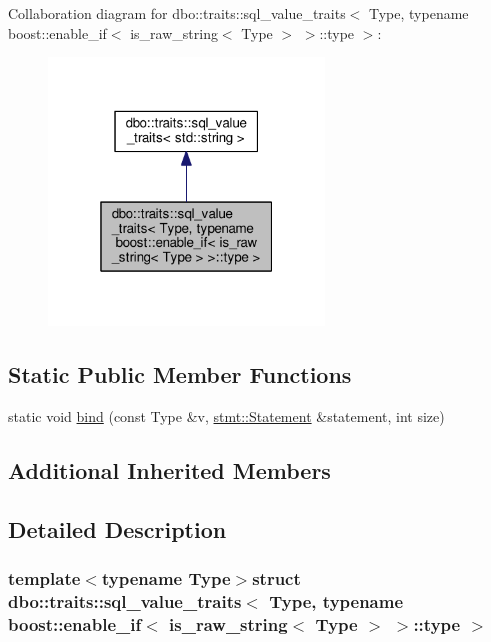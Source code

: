 Collaboration diagram for dbo\+:\+:traits\+:\+:sql\+\_\+value\+\_\+traits$<$ Type, typename boost\+:\+:enable\+\_\+if$<$ is\+\_\+raw\+\_\+string$<$ Type $>$ $>$\+:\+:type $>$\+:\nopagebreak
\begin{figure}[H]
\begin{center}
\leavevmode
\includegraphics[width=208pt]{structdbo_1_1traits_1_1sql__value__traits_3_01_type_00_01typename_01boost_1_1enable__if_3_01is__09f9c416e24b79e8600cb3841ebf4f44}
\end{center}
\end{figure}
\subsection*{Static Public Member Functions}
\begin{DoxyCompactItemize}
\item 
static void \hyperlink{structdbo_1_1traits_1_1sql__value__traits_3_01_type_00_01typename_01boost_1_1enable__if_3_01is__aa5117fa5e949e5d70ea0660f0e85288_acc179a3184edb8ce906de3d47d7bc017}{bind} (const Type \&v, \hyperlink{classdbo_1_1stmt_1_1_statement}{stmt\+::\+Statement} \&statement, int size)
\end{DoxyCompactItemize}
\subsection*{Additional Inherited Members}


\subsection{Detailed Description}
\subsubsection*{template$<$typename Type$>$struct dbo\+::traits\+::sql\+\_\+value\+\_\+traits$<$ Type, typename boost\+::enable\+\_\+if$<$ is\+\_\+raw\+\_\+string$<$ Type $>$ $>$\+::type $>$}

